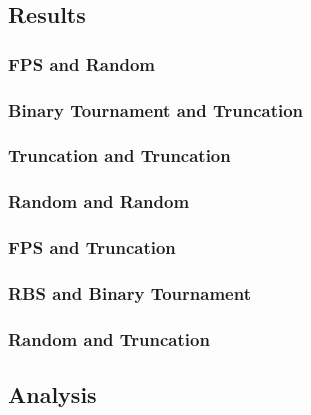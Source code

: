 \documentclass[12pt, letterpaper]{article}
\begin{document}
\subsection{Results} 
\subsubsection {FPS and Random}
\subsubsection {Binary Tournament and Truncation}
\subsubsection {Truncation and Truncation}
\subsubsection {Random and Random}
\subsubsection {FPS and Truncation}
\subsubsection {RBS and Binary Tournament}
\subsubsection {Random and Truncation}
\subsection{Analysis}
\end{document}
